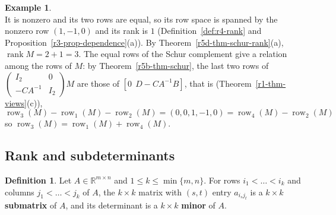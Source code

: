 \documentclass[12pt]{article}
\newcommand{\R}{\mathbb R}
\DeclareMathOperator{\row}{row}
\DeclareMathOperator{\rank}{rank}
\theoremstyle{definition}
\newtheorem{definition}[theorem]{Definition}
\newtheorem{example}[theorem]{Example}
\begin{document}
\begin{example}
\[\]
It is nonzero and its two rows are equal, so its row space is spanned by the nonzero row \((1,-1,0)\) and its rank
is \(1\) (Definition~\ref{def:r4-rank} and Proposition~\ref{r3-prop-dependence}(a)). By
Theorem~\ref{r5d-thm-schur-rank}(a),
\(\rank M=2+1=3\). The equal rows of the Schur complement give a relation among the rows of \(M\): by
Theorem~\ref{r5b-thm-schur}, the last two rows of
\(\left(\begin{smallmatrix}I_2&0\\-CA^{-1}&I_2\end{smallmatrix}\right)M\) are those of
\([0\ \ D-CA^{-1}B]\), that is (Theorem~\ref{r1-thm-views}(c)),
\[
\row_3(M)-\row_1(M)-\row_2(M)=(0,0,1,-1,0)=\row_4(M)-\row_2(M)
\]
so \(\row_3(M)=\row_1(M)+\row_4(M)\).
\end{example}

\subsection*{Rank and subdeterminants}

\begin{definition}\label{r5d-def-minor}
Let \(A\in\R^{m\times n}\) and \(1\leqslant k\leqslant\min\{m,n\}\). For rows \(i_1<\dots<i_k\) and columns \(j_1<\dots<j_k\)
of \(A\), the \(k\times k\) matrix with \((s,t)\) entry \(a_{i_sj_t}\) is a \(k\times k\) \textbf{submatrix} of \(A\), and its
determinant is a \(k\times k\) \textbf{minor} of \(A\).
\end{definition}
\end{document}

